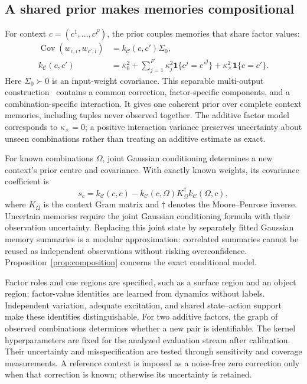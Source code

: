 \subsection{A shared prior makes memories compositional}\label{sec:sharedprior}
For context $c=(c^1,\ldots,c^F)$, the prior couples memories that share factor values:
\begin{align}
 \operatorname{Cov}(w_{c,i},w_{c',i})&=k_{\mathcal C}(c,c')\Sigma_0,\label{eq:sharedprior}\\
 k_{\mathcal C}(c,c')&=\kappa_0^2+
 \sum_{j=1}^F\kappa_j^2\mathbf 1\{c^j=c'^j\}
 +\kappa_\times^2\mathbf 1\{c=c'\}.\label{eq:contextkernel}
\end{align}
Here $\Sigma_0\succ0$ is an input-weight covariance. This separable multi-output construction~\cite{alvarez2012kernels} contains a common correction, factor-specific components, and a combination-specific interaction. It gives one coherent prior over complete context memories, including tuples never observed together. The additive factor model corresponds to $\kappa_\times=0$; a positive interaction variance preserves uncertainty about unseen combinations rather than treating an additive estimate as exact.

For known combinations $\Omega$, joint Gaussian conditioning determines a new context's prior centre and covariance. With exactly known weights, its covariance coefficient is
\begin{equation}\label{eq:conditionalvariance}
 s_c=k_{\mathcal C}(c,c)-k_{\mathcal C}(c,\Omega)
 K_\Omega^{\dagger}k_{\mathcal C}(\Omega,c),
\end{equation}
where $K_\Omega$ is the context Gram matrix and $\dagger$ denotes the Moore--Penrose inverse. Uncertain memories require the joint Gaussian conditioning formula with their observation uncertainty. Replacing this joint state by separately fitted Gaussian memory summaries is a modular approximation: correlated summaries cannot be reused as independent observations without risking overconfidence. Proposition~\ref{prop:composition} concerns the exact conditional model.

Factor roles and cue regions are specified, such as a surface region and an object region; factor-value identities are learned from dynamics without labels. Independent variation, adequate excitation, and shared state--action support make these identities distinguishable. For two additive factors, the graph of observed combinations determines whether a new pair is identifiable. The kernel hyperparameters are fixed for the analyzed evaluation stream after calibration. Their uncertainty and misspecification are tested through sensitivity and coverage measurements. A reference context is imposed as a noise-free zero correction only when that correction is known; otherwise its uncertainty is retained.

